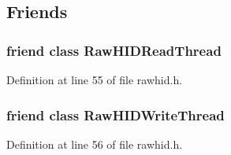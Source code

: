 \subsection{\-Friends}
\hypertarget{group___raw_h_i_d_plugin_ga8ff6a2bdea09543bed5912710ec13dab}{
\subsubsection[{\-Raw\-H\-I\-D\-Read\-Thread}]{\setlength{\rightskip}{0pt plus 5cm}friend class {\bf \-Raw\-H\-I\-D\-Read\-Thread}}}\label{group___raw_h_i_d_plugin_ga8ff6a2bdea09543bed5912710ec13dab}


\-Definition at line 55 of file rawhid.\-h.

\hypertarget{group___raw_h_i_d_plugin_ga2d3d87c46461ab8d3746b207989bb7f8}{
\subsubsection[{\-Raw\-H\-I\-D\-Write\-Thread}]{\setlength{\rightskip}{0pt plus 5cm}friend class {\bf \-Raw\-H\-I\-D\-Write\-Thread}}}\label{group___raw_h_i_d_plugin_ga2d3d87c46461ab8d3746b207989bb7f8}


\-Definition at line 56 of file rawhid.\-h.

